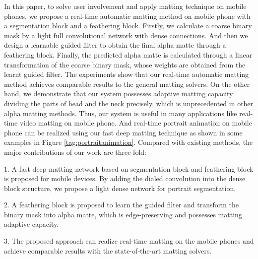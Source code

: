 \documentclass[sigconf]{acmart}
\begin{document}
In this paper, to solve user involvement and apply matting technique on mobile phones, we propose a real-time automatic matting method on mobile phone with a segmentation block and a feathering block. Firstly, we calculate a coarse binary mask by a light full convolutional network with dense connections. And then we design a learnable guided filter to obtain the final alpha matte through a feathering block. Finally, the predicted alpha matte is calculated through a linear transformation of the coarse binary mask, whose weights are obtained from the learnt guided filter. The experiments show that our real-time automatic matting method achieves comparable results to the general matting solvers. On the other hand, we demonstrate that our system possesses adaptive matting capacity dividing the parts of head and the neck precisely, which is unprecedented in other alpha matting methods. Thus, our system is useful in many applications like real-time video matting on mobile phone. And real-time portrait animation on mobile phone can be realized using our fast deep matting technique as shown in some examples in Figure \ref{tag:portraitanimation}. Compared with existing methods, the major contributions of our work are three-fold:

1. A fast deep matting network based on segmentation block and feathering block is proposed for mobile devices. By adding the dialed convolution into the dense block structure, we propose a light dense network for portrait segmentation.

2. A feathering block is proposed to learn the guided filter and transform the binary mask into alpha matte, which is edge-preserving and possesses matting adaptive capacity.

3. The proposed approach can realize real-time matting on the mobile phones and achieve comparable results with the state-of-the-art matting solvers.
\end{document}
